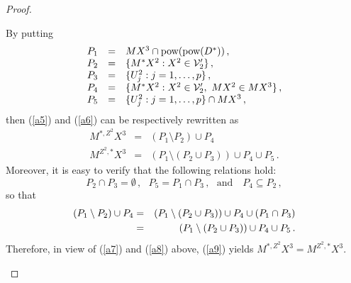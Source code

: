 \documentclass{fundam}
\newcommand{\pow}{\mbox{\rm pow}}
\begin{document}
\begin{proof}
\begin{enumerate}
    By putting
    \[
    \begin{array}{lll}
        P_{1} & = & MX^3 \cap \pow(\pow(D^{*}))\,,  \\
        P_{2} & = & \{M^{*}X^2: X^2 \in {\cal V}'_{2}\}\,,  \\
        P_{3} & = & \{U_{j}^2: j = 1,\ldots,p \}\,,  \\
        P_{4} & = & \{M^{*}X^2: X^2 \in {\cal V}'_{2},~MX^2 \in MX^3\}\,,  \\
        P_{5} & = & \{U_{j}^2: j = 1,\ldots,p\} \cap MX^3\,,
    \end{array}
    \]
    then (\ref{a5}) and (\ref{a6})
    can be respectively rewritten as
    \begin{eqnarray}
        M^{*,Z^2}X^3 & = & (P_{1} \setminus P_{2}) \cup P_{4} \label{a7}\\
        M^{Z^2,*}X^3 & = & (P_{1} \setminus (P_{2} \cup P_{3}))
                       \cup P_{4} \cup P_{5}\,.\label{a8}
    \end{eqnarray}
    Moreover, it is easy to verify that the following relations hold:
    \[
        P_{2} \cap P_{3}  =  \emptyset\,,~~~
        P_{5}  =  P_{1} \cap P_{3}\,,~~~ \text{and~~~}
        P_{4}  \subseteq  P_{2}\,,
    \]
    so that
    \begin{eqnarray}
    (P_{1} \setminus P_{2}) \cup P_{4} &=&
    (P_{1} \setminus (P_{2} \cup P_{3}))
     \cup P_{4} \cup (P_{1} \cap P_{3}) \notag\\
    &=& (P_{1} \setminus (P_{2} \cup P_{3})) \cup P_{4} \cup P_{5}\,.
    \label{a9}
    \end{eqnarray}
    Therefore, in view of (\ref{a7}) and (\ref{a8}) above,
    (\ref{a9})  yields $M^{*,Z^2}X^3 = M^{Z^2,*}X^3$.
\end{enumerate}
\end{proof}
\end{document}

